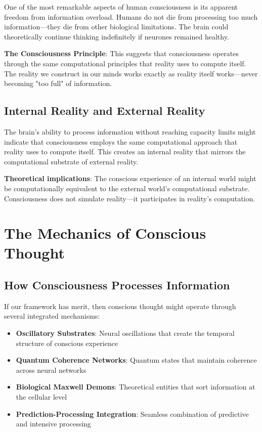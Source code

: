 \documentclass[12pt]{article}
\begin{document}
One of the most remarkable aspects of human consciousness is its apparent freedom from information overload. Humans do not die from processing too much information—they die from other biological limitations. The brain could theoretically continue thinking indefinitely if neurones remained healthy.

\textbf{The Consciousness Principle}: This suggests that consciousness operates through the same computational principles that reality uses to compute itself. The reality we construct in our minds works exactly as reality itself works—never becoming "too full" of information.

\subsection{Internal Reality and External Reality}

The brain's ability to process information without reaching capacity limits might indicate that consciousness employs the same computational approach that reality uses to compute itself. This creates an internal reality that mirrors the computational substrate of external reality.

\textbf{Theoretical implications}: The conscious experience of an internal world might be computationally equivalent to the external world's computational substrate. Consciousness does not simulate reality—it participates in reality's computation.

\section{The Mechanics of Conscious Thought}

\subsection{How Consciousness Processes Information}

If our framework has merit, then conscious thought might operate through several integrated mechanisms:

\begin{itemize}
\item \textbf{Oscillatory Substrates}: Neural oscillations that create the temporal structure of conscious experience
\item \textbf{Quantum Coherence Networks}: Quantum states that maintain coherence across neural networks
\item \textbf{Biological Maxwell Demons}: Theoretical entities that sort information at the cellular level
\item \textbf{Prediction-Processing Integration}: Seamless combination of predictive and intensive processing
\end{itemize}
\end{document}
